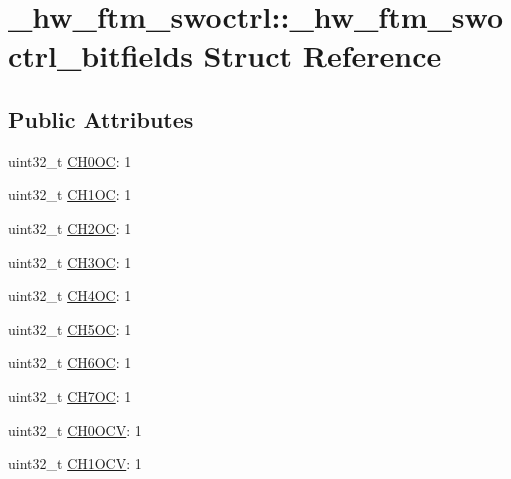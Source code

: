 \hypertarget{struct__hw__ftm__swoctrl_1_1__hw__ftm__swoctrl__bitfields}{}\section{\+\_\+hw\+\_\+ftm\+\_\+swoctrl\+:\+:\+\_\+hw\+\_\+ftm\+\_\+swoctrl\+\_\+bitfields Struct Reference}
\label{struct__hw__ftm__swoctrl_1_1__hw__ftm__swoctrl__bitfields}
\subsection*{Public Attributes}
\begin{DoxyCompactItemize}
\item 
uint32\+\_\+t \hyperlink{struct__hw__ftm__swoctrl_1_1__hw__ftm__swoctrl__bitfields_a21dcc7e0e04f439b86f65c746ed730da}{C\+H0\+OC}\+: 1
\item 
uint32\+\_\+t \hyperlink{struct__hw__ftm__swoctrl_1_1__hw__ftm__swoctrl__bitfields_a0bc0fff64b8e18b7dc8ebd5daefccbf9}{C\+H1\+OC}\+: 1
\item 
uint32\+\_\+t \hyperlink{struct__hw__ftm__swoctrl_1_1__hw__ftm__swoctrl__bitfields_aaf8f44976ae38c43cf4a6eb7e904f1c0}{C\+H2\+OC}\+: 1
\item 
uint32\+\_\+t \hyperlink{struct__hw__ftm__swoctrl_1_1__hw__ftm__swoctrl__bitfields_aedbacf0680b638ae934848ea9db2a456}{C\+H3\+OC}\+: 1
\item 
uint32\+\_\+t \hyperlink{struct__hw__ftm__swoctrl_1_1__hw__ftm__swoctrl__bitfields_a6efb4775ac2fec686da5922458218b42}{C\+H4\+OC}\+: 1
\item 
uint32\+\_\+t \hyperlink{struct__hw__ftm__swoctrl_1_1__hw__ftm__swoctrl__bitfields_af641f3845d77981d3686e5e9e10bdded}{C\+H5\+OC}\+: 1
\item 
uint32\+\_\+t \hyperlink{struct__hw__ftm__swoctrl_1_1__hw__ftm__swoctrl__bitfields_a4173b31ea860574d4baef0a51466e7eb}{C\+H6\+OC}\+: 1
\item 
uint32\+\_\+t \hyperlink{struct__hw__ftm__swoctrl_1_1__hw__ftm__swoctrl__bitfields_aca49f401f20f5a7eda95844f2ea54226}{C\+H7\+OC}\+: 1
\item 
uint32\+\_\+t \hyperlink{struct__hw__ftm__swoctrl_1_1__hw__ftm__swoctrl__bitfields_ae5753cec621733b3f82e2fb6a1698e34}{C\+H0\+O\+CV}\+: 1
\item 
uint32\+\_\+t \hyperlink{struct__hw__ftm__swoctrl_1_1__hw__ftm__swoctrl__bitfields_af7fe9d8e5cb73252958dae0ad220b372}{C\+H1\+O\+CV}\+: 1

\end{DoxyCompactItemize}
